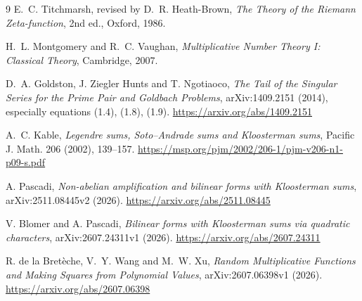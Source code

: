 \documentclass[11pt,a4paper]{ctexart}
\theoremstyle{definition}
\newcommand{\1}{\mathbf 1}
\begin{document}
\begin{thebibliography}{9}
E.~C. Titchmarsh, revised by D.~R. Heath-Brown,
\emph{The Theory of the Riemann Zeta-function}, 2nd ed., Oxford, 1986.

H.~L. Montgomery and R.~C. Vaughan,
\emph{Multiplicative Number Theory I: Classical Theory}, Cambridge, 2007.

D.~A. Goldston, J. Ziegler Hunts and T. Ngotiaoco,
\emph{The Tail of the Singular Series for the Prime Pair and Goldbach Problems},
arXiv:1409.2151 (2014), especially equations (1.4), (1.8), (1.9).
\url{https://arxiv.org/abs/1409.2151}

A.~C. Kable,
\emph{Legendre sums, Soto--Andrade sums and Kloosterman sums},
Pacific J. Math. 206 (2002), 139--157.
\url{https://msp.org/pjm/2002/206-1/pjm-v206-n1-p09-s.pdf}

A. Pascadi,
\emph{Non-abelian amplification and bilinear forms with Kloosterman sums},
arXiv:2511.08445v2 (2026).
\url{https://arxiv.org/abs/2511.08445}

V. Blomer and A. Pascadi,
\emph{Bilinear forms with Kloosterman sums via quadratic characters},
arXiv:2607.24311v1 (2026).
\url{https://arxiv.org/abs/2607.24311}

R. de la Bret\`eche, V.~Y. Wang and M.~W. Xu,
\emph{Random Multiplicative Functions and Making Squares from Polynomial Values},
arXiv:2607.06398v1 (2026).
\url{https://arxiv.org/abs/2607.06398}
\end{thebibliography}
\end{document}
